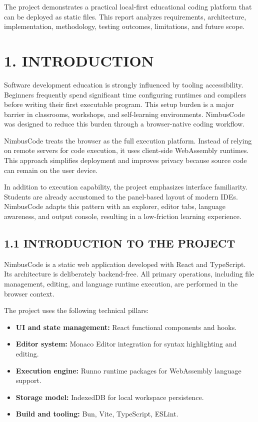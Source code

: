 The project demonstrates a practical local-first educational coding platform that can be deployed as static files. This report analyzes requirements, architecture, implementation, methodology, testing outcomes, limitations, and future scope.

\newpage

\tableofcontents
\newpage
\listoftables
\newpage
\listoffigures
\newpage


\section{1. INTRODUCTION}

Software development education is strongly influenced by tooling accessibility. Beginners frequently spend significant time configuring runtimes and compilers before writing their first executable program. This setup burden is a major barrier in classrooms, workshops, and self-learning environments. NimbusCode was designed to reduce this burden through a browser-native coding workflow.

NimbusCode treats the browser as the full execution platform. Instead of relying on remote servers for code execution, it uses client-side WebAssembly runtimes. This approach simplifies deployment and improves privacy because source code can remain on the user device.

In addition to execution capability, the project emphasizes interface familiarity. Students are already accustomed to the panel-based layout of modern IDEs. NimbusCode adapts this pattern with an explorer, editor tabs, language awareness, and output console, resulting in a low-friction learning experience.

\subsection{1.1 INTRODUCTION TO THE PROJECT}
NimbusCode is a static web application developed with React and TypeScript. Its architecture is deliberately backend-free. All primary operations, including file management, editing, and language runtime execution, are performed in the browser context.

The project uses the following technical pillars:
\begin{itemize}[leftmargin=8mm]
\item \textbf{UI and state management:} React functional components and hooks.
\item \textbf{Editor system:} Monaco Editor integration for syntax highlighting and editing.
\item \textbf{Execution engine:} Runno runtime packages for WebAssembly language support.
\item \textbf{Storage model:} IndexedDB for local workspace persistence.
\item \textbf{Build and tooling:} Bun, Vite, TypeScript, ESLint.
\end{itemize}

